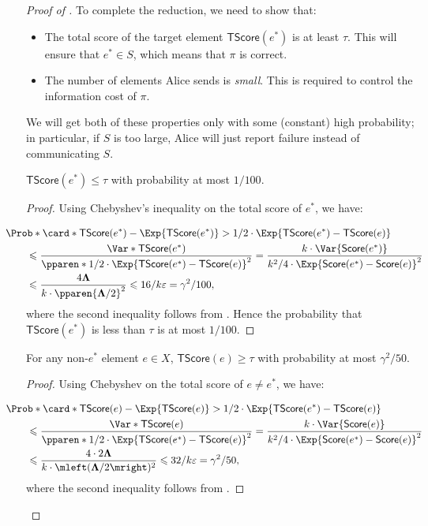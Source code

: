 \documentclass[11pt,letterpaper]{article}
\newcommand{\eps}{\varepsilon}
\renewcommand{\geq}{\geqslant}
\renewcommand{\leq}{\leqslant}
\theoremstyle{definition}
\DeclarePairedDelimiter{\pparen}()
\DeclarePairedDelimiter{\card}\vert\vert
\newcommand{\estar}{e^{\ast}}
\newcommand{\score}{\mathsf{Score}}
\newcommand{\totscore}{\mathsf{TScore}}
\newcommand{\rPTD}{\mathbf{\Lambda}}
\newcommand{\paren}[1]{\ensuremath{\mleft(#1\mright)}\xspace}
\begin{document}
\begin{proof}[Proof of ]
To complete the reduction, we need to show that:
\begin{itemize}
  \item The total score of the target element $\totscore(\estar)$ is at least
    $\tau$.
    This will ensure that $\estar \in S$, which means that $\pi$ is correct.
  \item The number of elements Alice sends is \emph{small}.
    This is required to control the information cost of $\pi$.
\end{itemize}
We will get both of these properties only with some (constant) high probability;
in particular, if $S$ is too large, Alice will just report failure instead
of communicating $S$.

\begin{claim}
  $\totscore(\estar) \leq \tau$ with probability at most $1 / 100$.
\end{claim}

\begin{proof}
Using Chebyshev's inequality on the total score of $\estar$, we have:

\begin{align*}
  &\mkern-36mu\Prob*{ \card*{\totscore(\estar) - \Exp{\totscore(\estar)}}
  > 1/2 \cdot \Exp{\totscore(\estar) - \totscore(e)} } \\
  &\leq \frac{ \Var*{\totscore(\estar)} }{\pparen*{1/2 \cdot \Exp{\totscore(\estar) - \totscore(e)}}^2}
  = \frac{k \cdot \Var{\score(\estar)}}{k^2 / 4 \cdot \Exp{\score(\estar) - \score(e)}^2}\\
  &\leq \frac{4\rPTD}{k\cdot\pparen{\rPTD/2}^2}
  \leq 16 / k\eps = \gamma^2/100,
\end{align*}
where the second inequality follows from .
Hence the probability that $\totscore(\estar)$ is less than $\tau$ is at most
$1/ 100$.
\end{proof}

\begin{claim}
  For any non-$\estar$ element $e \in X$, $\totscore(e) \geq \tau$ with
  probability at most $\gamma^2 / 50$.
\end{claim}

\begin{proof}
Using Chebyshev on the total score of $e \neq \estar$, we have:

\begin{align*}
  &\mkern-36mu\Prob*{ \card*{\totscore(e) - \Exp{\totscore(e)}}
  > 1/2 \cdot \Exp{\totscore(\estar) - \totscore(e)} } \\
  &\leq \frac{ \Var*{\totscore(e)} }{\pparen*{1/2 \cdot \Exp{\totscore(\estar) - \totscore(e)}}^2}
  = \frac{k \cdot \Var{\score(e)}}{k^2 / 4 \cdot \Exp{\score(\estar) - \score(e)}^2}\\
  &\leq \frac{4 \cdot 2\rPTD}{k \cdot \paren{\rPTD / 2}^2}
  \leq 32 / k\eps = \gamma^2/50,
\end{align*}
where the second inequality follows from .
\end{proof}


\end{proof}
\end{document}

